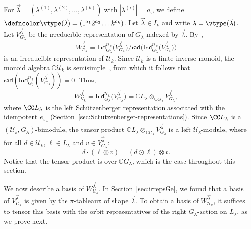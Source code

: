 For $\vec{\lambda} = (\lambda^{(1)}, \lambda^{(2)}, \ldots, \lambda^{(k)})$ with $|\lambda^{(i)}|=a_i$,
we define ${\defncolor \vtype(\vec{\lambda})} = (1^{a_1} 2^{a_2} \ldots k^{a_k})$.
Let $\vec{\lambda} \in I_k$ and write $\lambda = \vtype(\vec{\lambda})$.
Let $V_{G_\lambda}^{\vec{\lambda}}$ be the irreducible representation of $G_\lambda$ indexed by $\vec{\lambda}$.
By~\cite[Theorem 5.5]{Steinberg.2016},
\begin{equation*}
    W_{\mathcal{U}_k}^{\vec{\lambda}} = \mathsf{Ind}_{G_\lambda}^{\mathcal{U}_k}\big(V_{G_\lambda}^{\vec{\lambda}}\big) 
    \Big/ \mathsf{rad}\Big(\mathsf{Ind}_{G_\lambda}^{\mathcal{U}_k}\big(V_{G_\lambda}^{\vec{\lambda}}\big)\Big)
\end{equation*}
is an irreducible representation of $\mathcal{U}_k$.
Since $\mathcal{U}_k$ is a finite inverse monoid, the monoid algebra
$\mathbb{C}\mathcal{U}_k$ is semisimple~\cite[Corollary~9.4]{Steinberg.2016},
from which it follows that $\mathsf{rad}(\mathsf{Ind}_{G_\lambda}^{\mathcal{U}_k}(V_{G_\lambda}^{\vec{\lambda}})) = 0$.
Thus,
\begin{equation*}
    W_{\mathcal{U}_k}^{\vec{\lambda}} = \mathsf{Ind}_{G_\lambda}^{\mathcal{U}_k}\big(V_{G_\lambda}^{\vec{\lambda}}\big) 
    = \mathbb{C}L_\lambda \otimes_{\mathbb{C}G_\lambda} V_{G_\lambda}^{\vec{\lambda}},
\end{equation*}
where $\CC L_\lambda$ is the left Sch\"utzenberger representation associated with the idempotent $e_{\pi_\lambda}$
(\cf Section~\ref{sec:Schutzenberger-representations}).
Since $\CC L_\lambda$ is a $(\mathcal{U}_k, G_\lambda)$-bimodule, the tensor product
$\mathbb{C}L_\lambda \otimes_{\mathbb{C}G_\lambda} V_{G_\lambda}^{\vec{\lambda}}$ is a left
$\mathcal{U}_k$-module, where for all $d \in \mathcal{U}_k$, $\ell \in L_\lambda$ and $v \in V_{G_\lambda}^{\vec{\lambda}}$:
\begin{equation}\label{leftaction}
	d \cdot (\ell \otimes v)  = (d \odot \ell) \otimes v.
\end{equation}
Notice that the tensor product is over $\mathbb{C}G_\lambda$, which is the case throughout this section.

We now describe a basis of $W_{\mathcal{U}_k}^{\vec{\lambda}}$.
In Section~\ref{sec:irrepsGe}, we found that a basis of
$V_{G_\lambda}^{\vec{\lambda}}$ is given by the $\pi$-tableaux of shape $\vec{\lambda}$.
To obtain a basis of $W_{\mathcal{U}_k}^{\vec{\lambda}}$, it suffices to tensor this basis with
the orbit representatives of the right $G_\lambda$-action on $L_\lambda$,
as we prove next.

